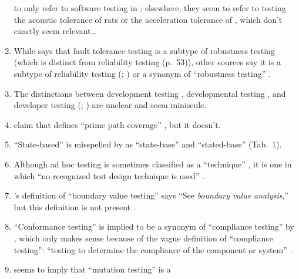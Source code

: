 \begin{enumerate}
            to only refer to software testing in \citep[p.~56]{Firesmith2015};
            elsewhere, they seem to refer to testing the acoustic tolerance of
            rats \citep{HolleyEtAl1996} or the acceleration tolerance of
            \accelTolTest{}, which don't exactly seem relevant\dots
      \item While \citeauthor{Firesmith2015} says that fault tolerance testing
            is a subtype of robustness testing
            \citeyearpar[p.~56]{Firesmith2015}
            (which is distinct from reliability testing (p.~53)), other sources
            say it is a subtype of reliability testing (\citealp[p.~375]{IEEE2017};
            \citealp[p.~7-10]{SWEBOK2024}) or a synonym of ``robustness
            testing'' \citepISTQB{}.
      \item The distinctions between development testing \citep[p.~136]{IEEE2017},
            developmental testing \citep[p.~30]{Firesmith2015}, and developer
            testing (\citealp[p.~39]{Firesmith2015}; \citealp[p.~11]{Gerrard2000a})
            are unclear and seem miniscule.
      \item \citeauthor{DoğanEtAl2014} claim that \citep{SakamotoEtAl2013}
            defines ``prime path coverage'' \citeyearpar[p.~184]{DoğanEtAl2014},
            but it doesn't.
      \item ``State-based'' is misspelled by \citeauthor{Kam2008} as
            ``state-base'' \citeyearpar[pp.~13,~15]{Kam2008} and
            ``stated-base'' (Tab.~1).
      \item Although ad hoc testing is sometimes classified as a ``technique''
            \citep[p.~5-14]{SWEBOK2024}, it is one in which ``no recognized test
            design technique is used'' \citep[p.~42]{Kam2008}.
      \item \citeauthor{Kam2008}'s definition of ``boundary value testing''
            says ``See \emph{boundary value analysis},'' but this definition is
            not present \citeyearpar{Kam2008}.
      \item ``Conformance testing'' is implied to be a synonym of ``compliance
            testing'' by \citeauthor{Kam2008}, which only makes sense because
            of the vague definition of ``compliance testing'': ``testing to
            determine the compliance of the component or system''
            \citeyearpar[p.~43]{Kam2008}.
      \item \citeauthor{Kam2008} seems to imply that ``mutation testing'' is a

\end{enumerate}
